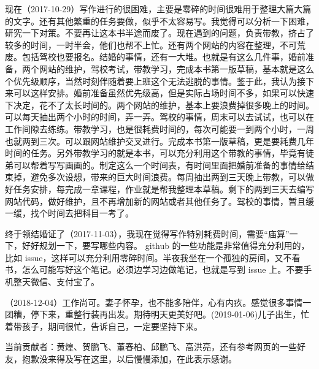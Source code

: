 \documentclass[doctor,openright,twoside]{sjtuthesis}
\newif\ifusepartquote
\newcommand{\thepartquote}{}
\newcommand{\thepartquoteauthor}{}
\newcommand{\partquote}[2]{\ifusepartquote\renewcommand{\thepartquote}{#1}\renewcommand{\thepartquoteauthor}{#2}\fi}
\newif\ifusepartintro
\newcommand{\thepartintro}{}
\newcommand{\partintro}[1]{\ifusepartintro\renewcommand{\thepartintro}{#1}\fi}
\theoremstyle{plain}
\theoremstyle{definition}
\theoremstyle{remark}
\theoremstyle{ocrenumbox}
\theoremstyle{plain}
\newcommand\cqh{“}
\newcommand\cqt{”}
\begin{document}
现在（2017-10-29）写作进行的很困难，主要是零碎的时间很难用于整理大篇大篇的文字。还有其他繁重的任务要做，似乎不太容易写。我觉得可以分析一下困难，研究一下对策。不要再让这本书半途而废了。现在遇到的问题，负责带教，挤占了较多的时间，一时半会，他们也帮不上忙。还有两个网站的内容在整理，不可荒废。包括驾校也要报名。结婚的事情，还有一大堆。也就是有这么几件事，婚前准备，两个网站的维护，驾校考试，带教学习，完成本书第一版草稿，基本就是这么个优先级顺序，当然时刻伴随着要上班这个无法逃脱的事情。鉴于此，我认为接下来可以这样安排。婚前准备虽然优先级高，但是实际占场时间不多，如果可以快速下决定，花不了太长时间的。两个网站的维护，基本上要浪费掉很多晚上的时间。可以每天抽出两个小时的时间，弄一弄。驾校的事情，周末可以去试试，也可以在工作间隙去练练。带教学习，也是很耗费时间的，每次可能要一到两个小时，一周也就两到三次。可以跟网站维护交叉进行。完成本书第一版草稿，更是要耗费几年时间的任务。另外带教学习的就是本书，可以充分利用这个带教的事情，毕竟有徒弟可以帮着写写画画的。制定这么一个时间表，有时间里面把婚前准备的事情给结束掉，避免多次设想，带来的巨大时间浪费。每周抽出两到三天晚上带教，可以做好任务安排，每完成一章课程，作业就是帮我整理本草稿。剩下的两到三天去编写网站代码，做好维护，且不再增加新的网站或者其他任务了。驾校的事情，暂且缓一缓，找个时间去把科目一考了。

终于领结婚证了（2017-11-03），我现在觉得写作特别耗费时间，需要\cqh 庙算\cqt 一下，好好规划一下，要写哪些内容。
github 的一些功能是非常值得充分利用的，比如
issue，这样可以充分利用零碎时间。半夜我坐在一个孤独的房间，又不看书，怎么可能写好这个笔记。必须边学习边做笔记，也就是写到
issue 上。不要手机整天微信、支付宝了。

（2018-12-04）工作尚可。妻子怀孕，也不能多陪伴，心有内疚。感觉很多事情一团糟，停下来，重整行装再出发。期待明天更美好吧。(2019-01-06)儿子出生，忙着带孩子，期间很忙，告诉自己，一定要坚持下来。

当前贡献者：黄煌、贺鹏飞、董春柏、邱鹏飞、高洪亮，还有参考网页的一些好友，抱歉没来得及写在这里，以后慢慢添加，在此表示感谢。

\mainmatter
\pagestyle{main}

\partquote{合抱之木，生于毫末；九层之台，起于垒土；千里之行，始于足下。}{老 \quad 子}

\partintro{
\quad\quad “话说天下大势，分久必合，合久必分”。
对于操作系统而言，Linux 有着类似的境地。
GNU/Linux 操作系统发行版众多而杂乱，有些发行版之间相互不兼容对方的软件，安装方法也不尽相同，有点军阀割据的感觉，给初学者带来了不少麻烦。

\quad\quad 但是，万变不离其宗，总有那么一些核心的东西是不变的，有人说这就是 Linux 哲学。
如同“分久必合”能够成功预言一样，那是因为大家骨子里的文化都是一致的，在变化中文化依旧能够保持一致，这样才可以再次“合”。
出于对深度 Deepin 操作系统理念的认同，我深信在某个地方存在着一个极强的凝聚力。我以为就是“敢为天下先”，“天道酬勤”，“愚公移山”，“世上本没有路，走的人多了，大家就都往这里走了。”

\quad\quad 本部分主要介绍 Linux 常识和 Linux 哲学，以及深度操作系统的理念和潜在用户。
}
\end{document}
